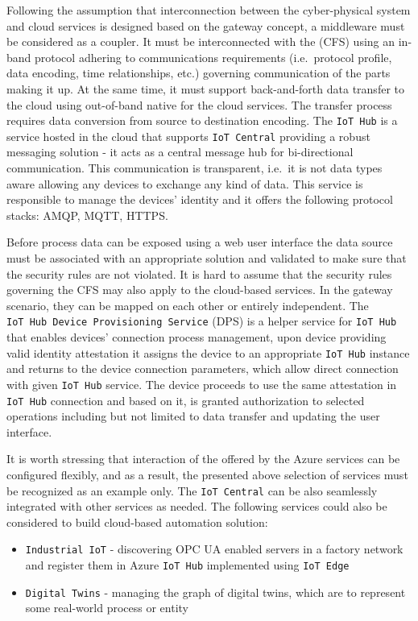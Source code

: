 \documentclass{jacsart}
\begin{document}
Following the assumption that interconnection between the cyber-physical
system and cloud services is designed based on the gateway concept, a
middleware must be considered as a coupler. It must be interconnected
with the (CFS) using an in-band protocol adhering to
communications requirements (i.e.~protocol profile, data encoding, time
relationships, etc.) governing communication of the parts making it up.
At the same time, it must support back-and-forth data transfer to the
cloud using out-of-band native for the cloud services. The transfer
process requires data conversion from source to destination encoding.
The \texttt{IoT\ Hub} is a service hosted in the cloud that supports
\texttt{IoT\ Central} providing a robust messaging solution - it acts as
a central message hub for bi-directional communication. This
communication is transparent, i.e.~it is not data types aware allowing
any devices to exchange any kind of data. This service is responsible to
manage the devices' identity and it offers the following protocol
stacks: AMQP, MQTT, HTTPS.

Before process data can be exposed using a web user interface the data source must be associated with an appropriate solution and validated to make sure that the security rules are not violated. It is hard to assume that the security rules governing the CFS may also apply to the cloud-based services. In the gateway scenario, they can be mapped on each other or entirely independent. The \texttt{IoT\ Hub\ Device\ Provisioning\ Service} (DPS) is a helper service for \texttt{IoT\ Hub} that enables devices' connection process management, upon device providing valid identity attestation it assigns the device to an appropriate \texttt{IoT\ Hub} instance and returns to the device connection parameters, which allow direct connection with given \texttt{IoT\ Hub} service. The device proceeds to use the same attestation in \texttt{IoT\ Hub} connection and based on it, is granted authorization to selected operations including but not limited to data transfer and updating the user interface.

It is worth stressing that interaction of the offered by the Azure
services can be configured flexibly, and as a result, the presented
above selection of services must be recognized as an example only. The
\texttt{IoT\ Central} can be also seamlessly integrated with other
services as needed. The following services could also be considered to
build cloud-based automation solution:

\begin{itemize}
      \item \texttt{Industrial\ IoT} - discovering OPC UA enabled servers in a factory network and register them in Azure \texttt{IoT\ Hub} implemented using \texttt{IoT\ Edge}
      \item \texttt{Digital\ Twins} - managing the graph of digital twins, which are to represent some real-world process or entity
\end{itemize}
\end{document}

